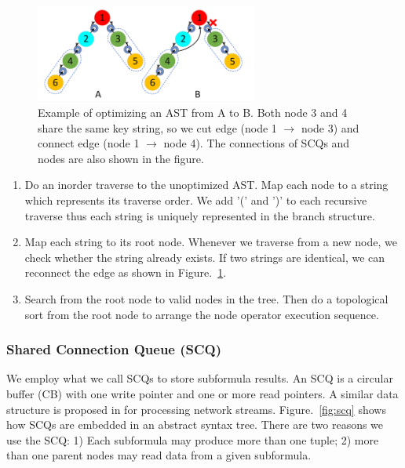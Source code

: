 \begin{figure}
\centering
\includegraphics[width=0.65\textwidth]{fig/opt_ast.pdf}
\caption{\label{fig:ast}Example of optimizing an AST from A to B. Both node 3 and 4 share the same key string, so we cut edge (node 1 $\rightarrow$ node 3) and connect edge (node 1 $\rightarrow$ node 4). The connections of SCQs and nodes are also shown in the figure.}
\end{figure}

\begin{enumerate}
\item Do an inorder traverse to the unoptimized AST. Map each node to a string which represents its traverse order. We add '(' and ')' to each recursive traverse thus each string is uniquely represented in the branch structure.
\item Map each string to its root node. Whenever we traverse from a new node, we check whether the string already exists. If two strings are identical, we can reconnect the edge as shown in Figure.~\ref{fig:ast}.
\item Search from the root node to valid nodes in the tree. Then do a topological sort from the root node to arrange the node operator execution sequence.
\end{enumerate}


\subsubsection{Shared Connection Queue (SCQ)}
We employ what we call SCQs to store subformula results. An SCQ is a circular buffer (CB) with one write pointer and one or more read pointers. A similar data structure is proposed in \cite{4812537} for processing network streams. Figure.~\ref{fig:scq} shows how SCQs are embedded in an \mltl abstract syntax tree. There are two reasons we use the SCQ: 1) Each subformula may produce more than one tuple; 2) more than one parent nodes may read data from a given subformula.\par

